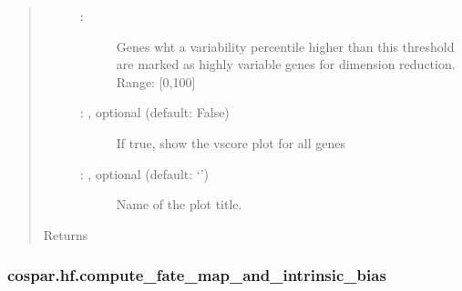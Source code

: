 \documentclass[letterpaper,10pt,english]{sphinxmanual}
\begin{document}
\begin{fulllineitems}
\begin{quote}
\begin{description}
\begin{description}
\item[{ : \sphinxstyleliteralemphasis{\sphinxupquote{, }}\sphinxstyleliteralemphasis{\sphinxupquote{ (}}\sphinxstyleliteralemphasis{\sphinxupquote{)}}}] \leavevmode
Genes wht a variability percentile higher than this threshold are marked as
highly variable genes for dimension reduction. Range: {[}0,100{]}

\item[{ : , optional (default: False)}] \leavevmode
If true, show the vscore plot for all genes

\item[{ : , optional (default: ‘’)}] \leavevmode
Name of the plot title.

\end{description}

\item[{Returns}] \leavevmode
{}

\end{description}\end{quote}

\end{fulllineitems}



\subsubsection{cospar.hf.compute\_fate\_map\_and\_intrinsic\_bias}
\label{\detokenize{cospar.hf.compute_fate_map_and_intrinsic_bias:cospar-hf-compute-fate-map-and-intrinsic-bias}}\label{\detokenize{cospar.hf.compute_fate_map_and_intrinsic_bias::doc}}
\end{document}
